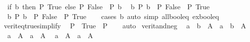 \begin{isabellebody}
\ \ {\isacartoucheopen}{\isacharparenleft}{\kern0pt}if\ b\ then\ P\ True\ else\ P\ False{\isacharparenright}{\kern0pt}\ {\isacharequal}{\kern0pt}\ P\ b{\isacartoucheclose}\isanewline
\ \ {\isacartoucheopen}{\isacharparenleft}{\kern0pt}{\isasymforall}b{\isachardot}{\kern0pt}\ P{\isacharprime}{\kern0pt}\ b{\isacharparenright}{\kern0pt}\ {\isacharequal}{\kern0pt}\ {\isacharparenleft}{\kern0pt}P{\isacharprime}{\kern0pt}\ False\ {\isasymand}\ P{\isacharprime}{\kern0pt}\ True{\isacharparenright}{\kern0pt}{\isacartoucheclose}\isanewline
\ \ {\isacartoucheopen}{\isacharparenleft}{\kern0pt}{\isasymexists}b{\isachardot}{\kern0pt}\ P{\isacharprime}{\kern0pt}\ b{\isacharparenright}{\kern0pt}\ {\isacharequal}{\kern0pt}\ {\isacharparenleft}{\kern0pt}P{\isacharprime}{\kern0pt}\ False\ {\isasymor}\ P{\isacharprime}{\kern0pt}\ True{\isacharparenright}{\kern0pt}{\isacartoucheclose}\isanewline
%
\isadelimproof
\ \ %
\endisadelimproof
%
\isatagproof
{}\isamarkupfalse%
\ {\isacharparenleft}{\kern0pt}cases\ b{\isacharparenright}{\kern0pt}\ {\isacharparenleft}{\kern0pt}auto\ simp{\isacharcolon}{\kern0pt}\ all{\isacharunderscore}{\kern0pt}bool{\isacharunderscore}{\kern0pt}eq\ ex{\isacharunderscore}{\kern0pt}bool{\isacharunderscore}{\kern0pt}eq{\isacharparenright}{\kern0pt}%
\endisatagproof
{\isafoldproof}%
%
\isadelimproof
\isanewline
%
\endisadelimproof
\isanewline
{}\isamarkupfalse%
\ verit{\isacharunderscore}{\kern0pt}eq{\isacharunderscore}{\kern0pt}true{\isacharunderscore}{\kern0pt}simplify{\isacharcolon}{\kern0pt}\isanewline
\ \ {\isacartoucheopen}{\isacharparenleft}{\kern0pt}P\ {\isacharequal}{\kern0pt}\ True{\isacharparenright}{\kern0pt}\ {\isasymequiv}\ P{\isacartoucheclose}\isanewline
%
\isadelimproof
\ \ %
\endisadelimproof
%
\isatagproof
{}\isamarkupfalse%
\ auto%
\endisatagproof
{\isafoldproof}%
%
\isadelimproof
\isanewline
%
\endisadelimproof
\isanewline
{}\isamarkupfalse%
\ verit{\isacharunderscore}{\kern0pt}and{\isacharunderscore}{\kern0pt}neg{\isacharcolon}{\kern0pt}\isanewline
\ \ {\isacartoucheopen}{\isacharparenleft}{\kern0pt}a\ {\isasymLongrightarrow}\ {\isasymnot}b\ {\isasymor}\ A{\isacharparenright}{\kern0pt}\ {\isasymLongrightarrow}\ {\isasymnot}{\isacharparenleft}{\kern0pt}a\ {\isasymand}\ b{\isacharparenright}{\kern0pt}\ {\isasymor}\ A{\isacartoucheclose}\isanewline
\ \ {\isacartoucheopen}{\isacharparenleft}{\kern0pt}a\ {\isasymLongrightarrow}\ A{\isacharparenright}{\kern0pt}\ {\isasymLongrightarrow}\ {\isasymnot}a\ {\isasymor}\ A{\isacartoucheclose}\isanewline
\ \ {\isacartoucheopen}{\isacharparenleft}{\kern0pt}{\isasymnot}a\ {\isasymLongrightarrow}\ A{\isacharparenright}{\kern0pt}\ {\isasymLongrightarrow}\ a\ {\isasymor}\ A{\isacartoucheclose}\isanewline

\end{isabellebody}
